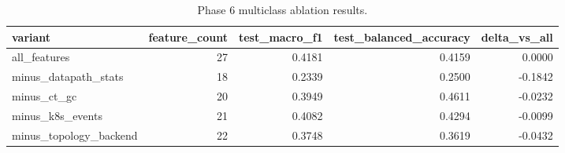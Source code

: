 \begin{table}[t]
\centering
\caption{Phase 6 multiclass ablation results.}
\label{tab:phase6_ablation_multiclass}
\begin{tabular}{lrrrr}
\hline
variant & feature\_count & test\_macro\_f1 & test\_balanced\_accuracy & delta\_vs\_all \\
\hline
all\_features & 27 & 0.4181 & 0.4159 & 0.0000 \\
minus\_datapath\_stats & 18 & 0.2339 & 0.2500 & -0.1842 \\
minus\_ct\_gc & 20 & 0.3949 & 0.4611 & -0.0232 \\
minus\_k8s\_events & 21 & 0.4082 & 0.4294 & -0.0099 \\
minus\_topology\_backend & 22 & 0.3748 & 0.3619 & -0.0432 \\
\hline
\end{tabular}
\end{table}
